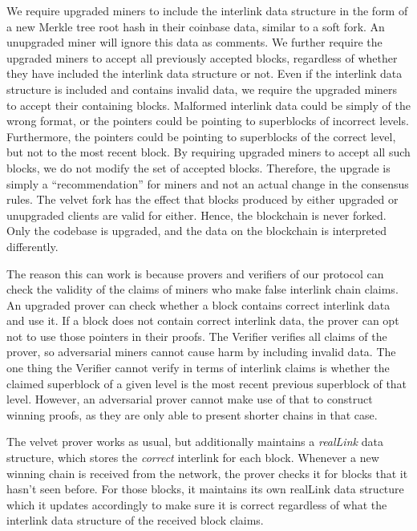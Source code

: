 We require upgraded miners to include the interlink data structure in the form
of a new Merkle tree root hash in their coinbase data, similar to a soft fork.
An unupgraded miner will ignore this data as comments. We further require the
upgraded miners to accept all previously accepted blocks, regardless of whether
they have included the interlink data structure or not. Even if the interlink
data structure is included and contains invalid data, we require the upgraded
miners to accept their containing blocks. Malformed interlink data could be
simply of the wrong format, or the pointers could be pointing to superblocks of
incorrect levels. Furthermore, the pointers could be pointing to superblocks of
the correct level, but not to the most recent block. By requiring upgraded
miners to accept all such blocks, we do not modify the set of accepted blocks.
Therefore, the upgrade is simply a ``recommendation'' for miners and not an
actual change in the consensus rules. The velvet fork has the effect that blocks
produced by either upgraded or unupgraded clients are valid for either. Hence,
the blockchain is never forked. Only the codebase is upgraded, and the  data on
the blockchain is interpreted differently.

The reason this can work is because provers and verifiers of our protocol can
check the validity of the claims of miners who make false interlink chain
claims. An upgraded prover can check whether a block contains correct interlink
data and use it. If a block does not contain correct interlink data, the prover
can opt not to use those pointers in their proofs. The Verifier verifies all
claims of the prover, so adversarial miners cannot cause harm by including
invalid data. The one thing the Verifier cannot verify in terms of interlink
claims is whether the claimed superblock of a given level is the most recent
previous superblock of that level. However, an adversarial prover cannot make
use of that to construct winning proofs, as they are only able to present
shorter chains in that case.

The velvet prover works as usual, but additionally maintains a \textit{realLink}
data structure, which stores the \textit{correct} interlink for each block.
Whenever a new winning chain is received from the network, the prover checks it
for blocks that it hasn't seen before. For those blocks, it maintains its own
realLink data structure which it updates accordingly to make sure it is correct
regardless of what the interlink data structure of the received block claims.

